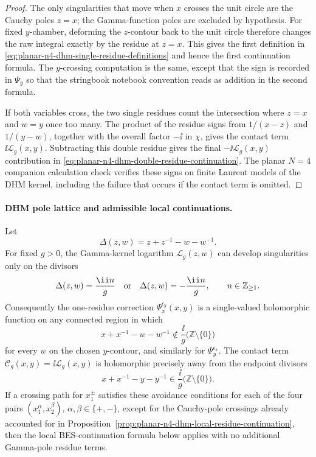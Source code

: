 \begin{proof}
The only singularities that move when \(x\) crosses the unit circle are the
Cauchy poles \(z=x\); the Gamma-function poles are excluded by hypothesis.
For fixed \(y\)-chamber, deforming the \(z\)-contour back to the unit circle
therefore changes the raw integral exactly by the residue at \(z=x\).  This
gives the first definition in
\eqref{eq:planar-n4-dhm-single-residue-definitions} and hence the first
continuation formula.  The \(y\)-crossing computation is the same, except
that the sign is recorded in \(\Psi_y\) so that the stringbook notebook
convention reads as addition in the second formula.

If both variables cross, the two single residues count the intersection
where \(z=x\) and \(w=y\) once too many.  The product of the residue signs
from \(1/(x-z)\) and \(1/(y-w)\), together with the overall factor
\(-\ii\) in \(\chi\), gives the contact term
\(\ii\mathcal L_g(x,y)\).  Subtracting this double residue gives the final
\(-\ii\mathcal L_g(x,y)\) contribution in
\eqref{eq:planar-n4-dhm-double-residue-continuation}.  The planar \(N=4\)
companion calculation check verifies these signs on finite Laurent models of
the DHM kernel, including the failure that occurs if the contact term is
omitted.
\end{proof}

\paragraph{DHM pole lattice and admissible local continuations.}
Let
\[
  \Delta(z,w)=z+z^{-1}-w-w^{-1}.
\]
For fixed \(g>0\), the Gamma-kernel logarithm \(\mathcal L_g(z,w)\) can
develop singularities only on the divisors
\begin{equation}
  \Delta(z,w)=\frac{\ii n}{g}
  \quad\hbox{or}\quad
  \Delta(z,w)=-\frac{\ii n}{g},
  \qquad n\in\mathbb Z_{\ge1}.
  \label{eq:planar-n4-dhm-pole-lattice}
\end{equation}
Consequently the one-residue correction \(\Psi_x^{\epsilon_y}(x,y)\) is a
single-valued holomorphic function on any connected region in which
\[
  x+x^{-1}-w-w^{-1}\notin \frac{\ii}{g}
  \bigl(\mathbb Z\setminus\{0\}\bigr)
\]
for every \(w\) on the chosen \(y\)-contour, and similarly for
\(\Psi_y^{\epsilon_x}\).  The contact term
\(\mathcal C_g(x,y)=\ii\mathcal L_g(x,y)\) is holomorphic precisely away
from the endpoint divisors
\[
  x+x^{-1}-y-y^{-1}\in
  \frac{\ii}{g}\bigl(\mathbb Z\setminus\{0\}\bigr).
\]
If a crossing path for \(x_1^\pm\) satisfies these avoidance conditions for
each of the four pairs \((x_1^\alpha,x_2^\beta)\),
\(\alpha,\beta\in\{+,-\}\), except for the Cauchy-pole crossings already
accounted for in
Proposition~\ref{prop:planar-n4-dhm-local-residue-continuation}, then
the local BES-continuation formula below applies with no additional
Gamma-pole residue terms.

